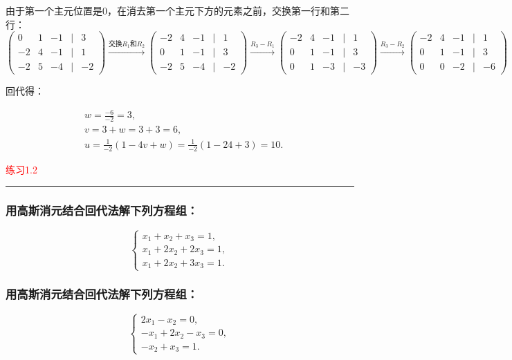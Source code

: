 由于第一个主元位置是0，在消去第一个主元下方的元素之前，交换第一行和第二行：
\[
\begin{pmatrix}
	\boxed{0} & 1 & -1 & \big| & 3 \\
	-2 & 4 & -1 & \big| & 1 \\
	-2 & 5 & -4 & \big| & -2
\end{pmatrix}
\xrightarrow{\text{交换} R_1 \text{和} R_2}
\begin{pmatrix}
	\boxed{-2} & 4 & -1 & \big| & 1 \\
	0 & 1 & -1 & \big| & 3 \\
	-2 & 5 & -4 & \big| & -2
\end{pmatrix}
\xrightarrow{R_3 - R_1}
\begin{pmatrix}
	-2 & 4 & -1 & \big| & 1 \\
	0 & \boxed{1} & -1 & \big| & 3 \\
	0 & 1 & -3 & \big| & -3
\end{pmatrix}
\xrightarrow{R_3 - R_2}
\begin{pmatrix}
	-2 & 4 & -1 & \big| & 1 \\
	0 & 1 & -1 & \big| & 3 \\
	0 & 0 & -2 & \big| & -6
\end{pmatrix}
\]

回代得：

\[\begin{aligned}&w=\frac{-6}{-2}=3,\\&v=3+w=3+3=6,\\&u=\frac{1}{-2}\left(1-4v+w\right)=\frac{1}{-2}\left(1-24+3\right)=10.\end{aligned}\]

\textcolor{red}{练习1.2}
\color{red}\rule{\textwidth}{0.4pt}\color{black}

\subsubsection{用高斯消元结合回代法解下列方程组：}
\[
\begin{cases}
	x_1 + x_2 + x_3 = 1, \\
	x_1 + 2x_2 + 2x_3 = 1, \\
	x_1 + 2x_2 + 3x_3 = 1.
\end{cases}
\]

\subsubsection{用高斯消元结合回代法解下列方程组：}
\[
\begin{cases}
	2x_1 - x_2 = 0, \\
	-x_1 + 2x_2 - x_3 = 0, \\
	-x_2 + x_3 = 1.
\end{cases}
\]
